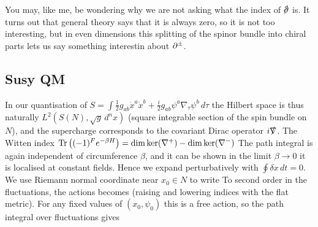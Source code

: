 \documentclass{article}
\begin{document}
\begin{remark}
	You may, like me, be wondering why we are not asking what the index of $\slashed{\del}$ is. It turns out that general theory says that it is always zero, so it is not too interesting, but in even dimensions this splitting of the spinor bundle into chiral parts lets us say something interestin about $\partial^\pm$. 
\end{remark}

\subsection{Susy QM}
In our quantisation of $S = \int \frac{1}{2} g_{ab} \dot{x}^a \dot{x}^b + \frac{i}{2} g_{ab} \psi^a \nabla_\tau \psi^b \, d\tau$
the Hilbert space is thus naturally $L^2(S(N),\sqrt{g} \, d^n x)$ (square integrable section of the spin bundle on $N$), and the supercharge 
corresponds to the covariant Dirac operator $i \slashed{\nabla}$. The Witten index $\operatorname{Tr} \left( (-1)^F e^{-\beta H} \right) = \dim \ker (\nabla^+) - \dim \ker (\nabla^-)$
The path integral is again independent of circumference $\beta$, and it can be shown in the limit $\beta \to 0$ it is localised at constant fields. Hence we expand perturbatively
with $\oint \delta x \, dt = 0$. We use Riemann normal coordinate near $x_0 \in N$ to write 
To second order in the fluctuations, the actions becomes 
(raising and lowering indices with the flat metric). For any fixed values of $(x_0,\psi_0)$ this is a free action, so the path integral over fluctuations gives 
\end{document}

